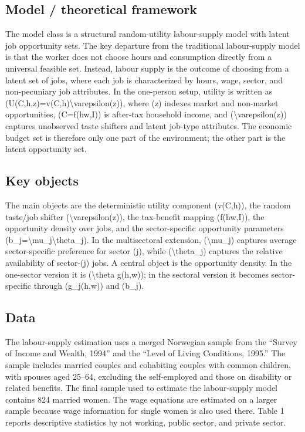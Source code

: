 \documentclass[11pt,a4paper]{article}
\begin{document}
\subsection*{Model / theoretical framework}
The model class is a structural random-utility labour-supply model with latent job opportunity sets. The key departure from the traditional labour-supply model is that the worker does not choose hours and consumption directly from a universal feasible set. Instead, labour supply is the outcome of choosing from a latent set of jobs, where each job is characterized by hours, wage, sector, and non-pecuniary job attributes. In the one-person setup, utility is written as (U(C,h,z)=v(C,h)\textbackslash{}varepsilon(z)), where (z) indexes market and non-market opportunities, (C=f(hw,I)) is after-tax household income, and (\textbackslash{}varepsilon(z)) captures unobserved taste shifters and latent job-type attributes. The economic budget set is therefore only one part of the environment; the other part is the latent opportunity set.

\subsection*{Key objects}
The main objects are the deterministic utility component (v(C,h)), the random taste/job shifter (\textbackslash{}varepsilon(z)), the tax-benefit mapping (f(hw,I)), the opportunity density over jobs, and the sector-specific opportunity parameters (b\_j=\textbackslash{}mu\_j\textbackslash{}theta\_j). In the multisectoral extension, (\textbackslash{}mu\_j) captures average sector-specific preference for sector (j), while (\textbackslash{}theta\_j) captures the relative availability of sector-(j) jobs. A central object is the opportunity density. In the one-sector version it is (\textbackslash{}theta g(h,w)); in the sectoral version it becomes sector-specific through (g\_j(h,w)) and (b\_j).

\subsection*{Data}
The labour-supply estimation uses a merged Norwegian sample from the “Survey of Income and Wealth, 1994” and the “Level of Living Conditions, 1995.” The sample includes married couples and cohabiting couples with common children, with spouses aged 25–64, excluding the self-employed and those on disability or related benefits. The final sample used to estimate the labour-supply model contains 824 married women. The wage equations are estimated on a larger sample because wage information for single women is also used there. Table 1 reports descriptive statistics by not working, public sector, and private sector.
\end{document}
